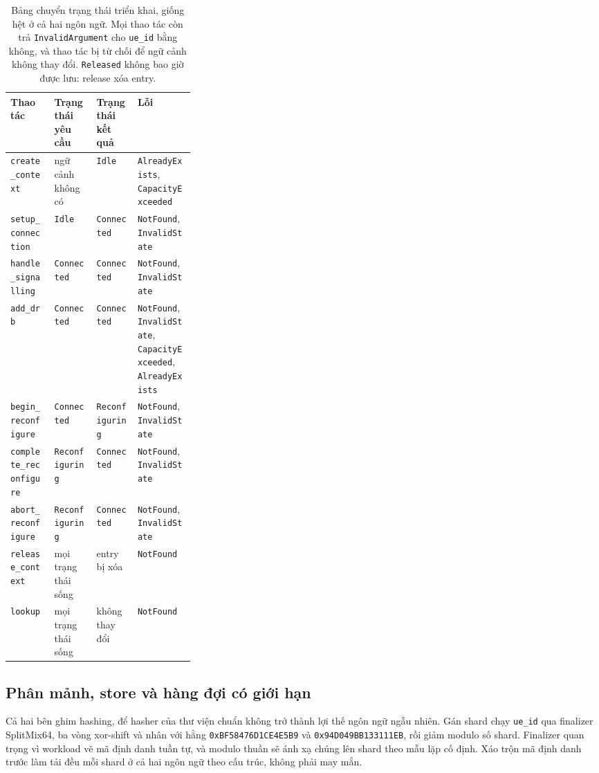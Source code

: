 \begin{table}[H]
\centering
\small
\caption[Bảng chuyển trạng thái triển khai]{Bảng chuyển trạng thái triển khai, giống hệt ở cả hai ngôn ngữ. Mọi thao tác
còn trả \texttt{InvalidArgument} cho \texttt{ue\_id} bằng không, và thao tác bị từ chối
để ngữ cảnh không thay đổi. \texttt{Released} không bao giờ được lưu: release xóa
entry.\label{tab:transitions}}
\begin{tabular}{@{}l l l R{0.31\linewidth}@{}}
\hline\hline
Thao tác & Trạng thái yêu cầu & Trạng thái kết quả & Lỗi \\
\hline
\texttt{create\_context}       & ngữ cảnh không có   & \texttt{Idle}          & \texttt{AlreadyExists}, \texttt{CapacityExceeded} \\
\texttt{setup\_connection}     & \texttt{Idle}          & \texttt{Connected}     & \texttt{NotFound}, \texttt{InvalidState} \\
\texttt{handle\_signalling}     & \texttt{Connected}     & \texttt{Connected}     & \texttt{NotFound}, \texttt{InvalidState} \\
\texttt{add\_drb}              & \texttt{Connected}     & \texttt{Connected}     & \texttt{NotFound}, \texttt{InvalidState}, \texttt{CapacityExceeded}, \texttt{AlreadyExists} \\
\texttt{begin\_reconfigure}    & \texttt{Connected}     & \texttt{Reconfiguring} & \texttt{NotFound}, \texttt{InvalidState} \\
\texttt{complete\_reconfigure} & \texttt{Reconfiguring} & \texttt{Connected}     & \texttt{NotFound}, \texttt{InvalidState} \\
\texttt{abort\_reconfigure}    & \texttt{Reconfiguring} & \texttt{Connected}     & \texttt{NotFound}, \texttt{InvalidState} \\
\texttt{release\_context}      & mọi trạng thái sống   & entry bị xóa           & \texttt{NotFound} \\
\texttt{lookup}                & mọi trạng thái sống   & không thay đổi              & \texttt{NotFound} \\
\hline
\end{tabular}
\end{table}

\subsection{Phân mảnh, store và hàng đợi có giới hạn}
Cả hai bên ghim hashing, để hasher của thư viện chuẩn không trở thành lợi thế
ngôn ngữ ngẫu nhiên. Gán shard chạy \texttt{ue\_id} qua finalizer SplitMix64,
ba vòng xor-shift và nhân với hằng
\texttt{0xBF58476D1CE4E5B9} và \texttt{0x94D049BB133111EB}, rồi giảm modulo số
shard. Finalizer quan trọng vì workload vẽ mã định danh tuần tự, và modulo
thuần sẽ ánh xạ chúng lên shard theo mẫu lặp cố định. Xáo trộn mã định danh trước
làm tải đều mỗi shard ở cả hai ngôn ngữ theo cấu trúc, không phải may mắn.

